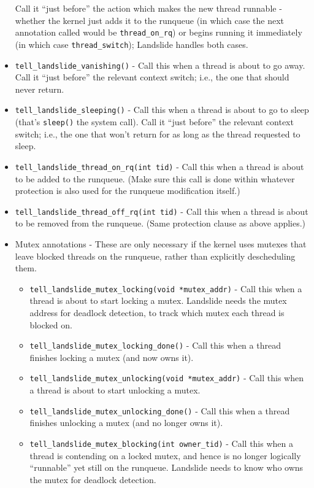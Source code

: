 \begin{itemize}
		Call it ``just before'' the action which makes the new thread runnable - whether the kernel just adds it to the runqueue (in which case the next annotation called would be \texttt{thread\_on\_rq}) or begins running it immediately (in which case \texttt{thread\_switch}); Landslide handles both cases.
	\item \texttt{tell\_landslide\_vanishing()} - Call this when a thread is about to go away.
		Call it ``just before'' the relevant context switch; i.e., the one that should never return.
	\item \texttt{tell\_landslide\_sleeping()} - Call this when a thread is about to go to sleep (that's \texttt{sleep()} the system call).
		Call it ``just before'' the relevant context switch; i.e., the one that won't return for as long as the thread requested to sleep.
	\item \texttt{tell\_landslide\_thread\_on\_rq(int tid)} - Call this when a thread is about to be added to the runqueue.
		(Make sure this call is done within whatever protection is also used for the runqueue modification itself.)
	\item \texttt{tell\_landslide\_thread\_off\_rq(int tid)} - Call this when a thread is about to be removed from the runqueue. (Same protection clause as above applies.)
	\item Mutex annotations - These are only necessary if the kernel uses mutexes that leave blocked threads on the runqueue, rather than explicitly descheduling them.
	\begin{itemize}
		\item \texttt{tell\_landslide\_mutex\_locking(void *mutex\_addr)} - Call this when a thread is about to start locking a mutex. Landslide needs the mutex address for deadlock detection, to track which mutex each thread is blocked on.
		\item \texttt{tell\_landslide\_mutex\_locking\_done()} - Call this when a thread finishes locking a mutex (and now owns it).
		\item \texttt{tell\_landslide\_mutex\_unlocking(void *mutex\_addr)} - Call this when a thread is about to start unlocking a mutex.
		\item \texttt{tell\_landslide\_mutex\_unlocking\_done()} - Call this when a thread finishes unlocking a mutex (and no longer owns it).
		\item \texttt{tell\_landslide\_mutex\_blocking(int owner\_tid)} - Call this when a thread is contending on a locked mutex, and hence is no longer logically ``runnable'' yet still on the runqueue. Landslide needs to know who owns the mutex for deadlock detection.
	\end{itemize}
\end{itemize}


